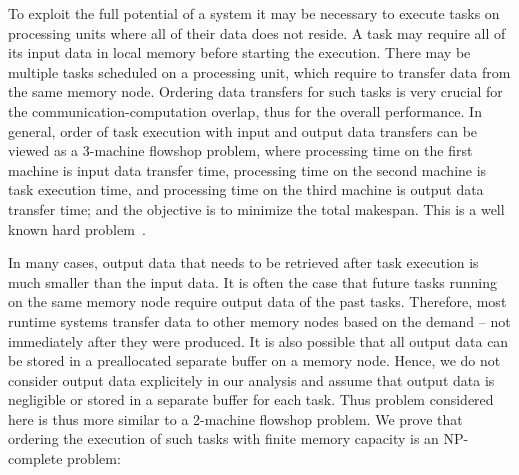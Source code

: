 \documentclass[sigconf]{acmart}
\begin{document}
	To exploit the full potential of a system it may be necessary to execute tasks on processing
	units where all of their data does not reside. A task may require all of its input data
	in local memory before starting the execution. There may be multiple tasks
	scheduled on a processing unit, which require to transfer data from the same
	memory node. Ordering data transfers for such tasks is very crucial for the
	communication-computation overlap, thus for the overall
	performance. In general, order of task execution with input
	and output data transfers can be  
	viewed as a 3-machine flowshop problem, where processing time on the first machine is 
	input data transfer time, processing time on the second machine is task execution time, 
	and processing time on the third machine is output data transfer time; and the objective is 
	to minimize the total makespan. This is a well known hard problem~\cite{NPComplete3Machine,johnson}.
	
	
	In many cases, output data that needs to be retrieved after task execution is much smaller than the input data. It is often the case that future tasks running on the same memory node require output data of the past tasks. Therefore, most runtime systems transfer data to other memory nodes based on the demand -- not immediately after they were produced. It is also possible that all output data can be stored in a preallocated separate buffer on a memory node. Hence, we do not consider output data explicitely in our analysis and assume that output data is negligible or stored in a separate buffer for each task. Thus problem considered here is thus more similar to a 2-machine flowshop problem. We prove that ordering the execution of such tasks with finite memory capacity is an NP-complete problem: %
	
	
\end{document}

